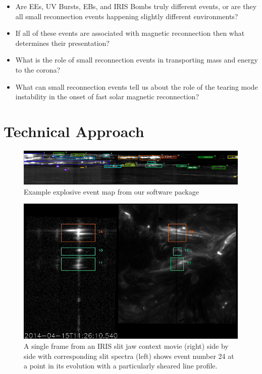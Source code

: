 \documentclass[]{aastex6}
\begin{document}
		\begin{itemize}
	
			\item Are EEs, UV Bursts, EBs, and IRIS Bombs truly different events, or are they all small reconnection events happening slightly different environments?
			\item If all of these events are associated with magnetic reconnection then what determines their presentation?
			\item What is the role of small reconnection events in transporting mass and energy to the corona?
			\item What can small reconnection events tell us about the role of the tearing mode instability in the onset of fast solar magnetic reconnection?
			
			
		\end{itemize}
		


\section{Technical Approach} 


\begin{figure}
	\label{fig:eemap}
	\caption{Example explosive event map from our software package}
	\centerline{\includegraphics[scale=.5]{./NESSF_img/ee_map.eps}}
	
\end{figure}

\begin{figure}
	
	\caption{A single frame from an IRIS slit jaw context movie (right) side by side with corresponding slit spectra (left) shows event number 24 at a point in its evolution with a particularly sheared line profile.}
	\centerline{\includegraphics[scale=.4]{NESSF_img/01481.jpg}}
	\label{fig:eemovie}
\end{figure}
\end{document}
